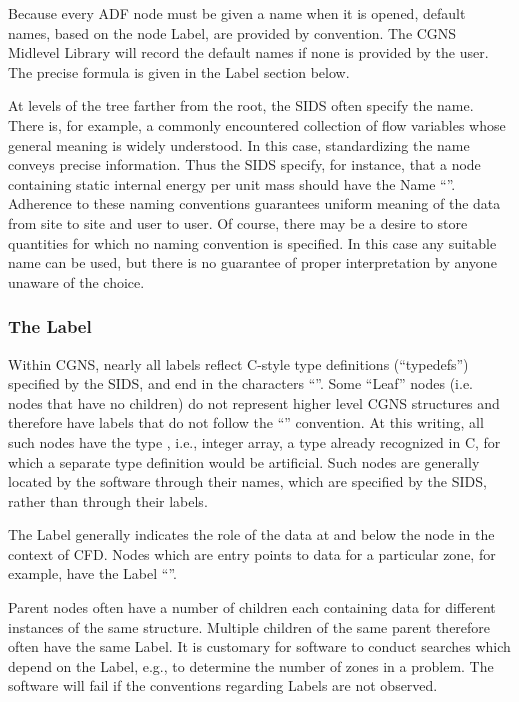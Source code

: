 Because every ADF node must be given a name when it is opened, default
names, based on the node Label, are provided by convention. The CGNS
Midlevel Library will record the default names if none is provided by
the user. The precise formula is given in the Label section below.

At levels of the tree farther from the root, the SIDS often specify
the name. There is, for example, a commonly encountered collection of
flow variables whose general meaning is widely understood. In this
case, standardizing the name conveys precise information. Thus the SIDS
specify, for instance, that a node containing static internal energy
per unit mass should have the Name ``''. Adherence
to these naming conventions guarantees uniform meaning of the data from
site to site and user to user. Of course, there may be a desire to
store quantities for which no naming convention is specified. In this
case any suitable name can be used, but there is no guarantee of proper
interpretation by anyone unaware of the choice.

\subsubsection{The Label}

Within CGNS, nearly all labels reflect C-style type definitions
(``typedefs'') specified by the SIDS, and end in the characters
``''. Some ``Leaf'' nodes (i.e. nodes that have no children)
do not represent higher level CGNS structures and therefore have labels
that do not follow the ``'' convention. At this writing, all
such nodes have the type , i.e., integer array, a type
already recognized in C, for which a separate type definition would be
artificial. Such nodes are generally located by the software through
their names, which are specified by the SIDS, rather than through their
labels.

The Label generally indicates the role of the data at and below the
node in the context of CFD. Nodes which are entry points to data for a
particular zone, for example, have the Label ``''.

Parent nodes often have a number of children each containing data for
different instances of the same structure. Multiple children of the same
parent therefore often have the same Label. It is customary for software
to conduct searches which depend on the Label, e.g., to determine the
number of zones in a problem. The software will fail if the conventions
regarding Labels are not observed.

